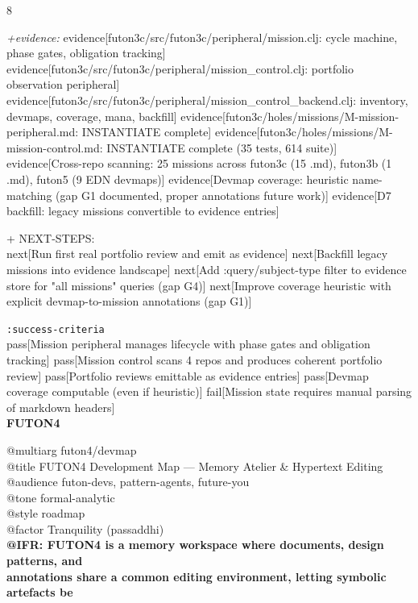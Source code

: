\documentclass[landscape]{article}
\newcommand{\flexitag}[1]{\textcolor[gray]{0.35}{\textit{#1}}}
\newenvironment{devmapactive}{%
  \def\FrameCommand{\colorbox{devmapactivebg}}%
  \setlength{\fboxsep}{2pt}%
  \MakeFramed{\advance\hsize-\width \FrameRestore}%
}{\endMakeFramed}
\begin{document}
\begin{paracol}{8}
\begin{devmapactive}
  \flexitag{+evidence:} evidence[futon3c/src/futon3c/peripheral/mission.clj: cycle machine, phase gates, obligation tracking] evidence[futon3c/src/futon3c/peripheral/mission\_control.clj: portfolio observation peripheral] evidence[futon3c/src/futon3c/peripheral/mission\_control\_backend.clj: inventory, devmaps, coverage, mana, backfill] evidence[futon3c/holes/missions/M-mission-peripheral.md: INSTANTIATE complete] evidence[futon3c/holes/missions/M-mission-control.md: INSTANTIATE complete (35 tests, 614 suite)] evidence[Cross-repo scanning: 25 missions across futon3c (15 .md), futon3b (1 .md), futon5 (9 EDN devmaps)] evidence[Devmap coverage: heuristic name-matching (gap G1 documented, proper annotations future work)] evidence[D7 backfill: legacy missions convertible to evidence entries]\\
\par
  + NEXT-STEPS:\\
    next[Run first real portfolio review and emit as evidence] next[Backfill legacy missions into evidence landscape] next[Add :query/subject-type filter to evidence store for "all missions" queries (gap G4)] next[Improve coverage heuristic with explicit devmap-to-mission annotations (gap G1)]\\
\par
  \texttt{:\allowbreak{}success-\allowbreak{}criteria}\\
    pass[Mission peripheral manages lifecycle with phase gates and obligation tracking] pass[Mission control scans 4 repos and produces coherent portfolio review] pass[Portfolio reviews emittable as evidence entries] pass[Devmap coverage computable (even if heuristic)] fail[Mission state requires manual parsing of markdown headers]\\
\end{devmapactive}
\switchcolumn
\textbf{FUTON4}\par
\medskip
@multiarg futon4/devmap\\
@title FUTON4 Development Map — Memory Atelier \& Hypertext Editing\\
@audience futon-devs, pattern-agents, future-you\\
@tone formal-analytic\\
@style roadmap\\
@factor Tranquility (passaddhi)\\
\textbf{@IFR: FUTON4 is a memory workspace where documents, design patterns, and}\\
\textbf{annotations share a common editing environment, letting symbolic artefacts be}\\

\end{paracol}
\end{document}
